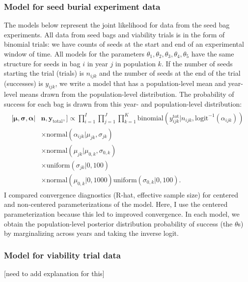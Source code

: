 \documentclass[12pt, oneside, titlepage]{article}   	%
\begin{document}
\subsubsection*{Model for seed burial experiment data}

The models below represent the joint likelihood for data from the seed bag experiments. All data from seed bags and viability trials is in the form of binomial trials: we have counts of seeds at the start and end of an experimental window of time. All models for the parameters $\theta_1, \theta_2, \theta_3, \theta_4, \theta_5$ have the same structure for seeds in bag $i$ in year $j$ in population $k$. If the number of seeds starting the trial (trials) is $n_{ijk}$ and the number of seeds at the end of the trial (successes) is $y_{ijk}$, we write a model that has a population-level mean and year-level means drawn from the population-level distribution. The probability of success for each bag is drawn from this year- and population-level distribution:
%
\begin{align}
  \begin{split}
 [ \bm{\mu}, \bm{\sigma}, \bm{\alpha} | & \bm{n}, \bm{y_{\mathrm{total}}},  ] \propto \prod_{i=1}^{I}   \prod_{j=1}^{J}  \prod_{k=1}^{K} 
   \mathrm{binomial} ( y^{\mathrm{tot}}_{ijk} | n_{ijk}, \mathrm{logit}^{-1}( \alpha_{ijk} ) ) 
   \\ & \times \mathrm{normal} ( \alpha_{ijk}  | \mu_{jk}, \sigma{_{jk} })
  \\ & \times \mathrm{normal} ( \mu_{jk}  | \mu_{0,k}, \sigma{_{0,k} })
  \\ & \times \mathrm{uniform} ( \sigma_{jk} | 0,100)
  \\ & \times \mathrm{normal} ( \mu_{0,k} | 0 , 1000 ) \mathrm{uniform} ( \sigma_{0,k} | 0,100).
  \end{split}
\end{align}
%
I compared convergence diagnostics (R-hat, effective sample size) for centered and non-centered parameterizations of the model. Here, I use the centered parameterization because this led to improved convergence. In each model, we obtain the population-level posterior distribution probability of success (the $\theta$s) by marginalizing across years and taking the inverse logit.

\subsubsection*{Model for viability trial data}

[need to add explanation for this]
\end{document}
